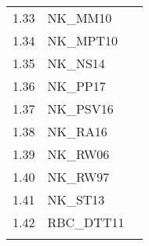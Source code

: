 \documentclass[11pt,a4paper]{article}
\begin{document}
\begin{table}[H]
\begin{tabularx}{\textwidth}{lll}
			1.33 &	NK\_MM10	&	\cite{MehMoran2010}	\\								
			1.34	&	NK\_MPT10	&	\cite{monacelli2010unemployment}	\\								
			1.35	&	NK\_NS14	&	\cite{NakamuraSteinsson2014}	\\								
			1.36	&	NK\_PP17	&	\cite{paoli2017coordinating}	\\								
			1.37	&	NK\_PSV16	&	\cite{pancrazi2016price}	\\								
			1.38	&	NK\_RA16	&	\cite{rannenberg2016bank}	\\								
			1.39\footnotemark[1]	&	NK\_RW06	&	\cite{RavennaWalsh2006}\\%
			1.40\footnotemark[1]	&	NK\_RW97	&	\cite{RotembergWoodford1997}	\\%
			1.41	&	NK\_ST13	&	\cite{stracca2013inside}	\\								
			1.42	&	RBC\_DTT11	&	\cite{DeFioreetal2011}	\\								
			
			&& \\
		
			\hline \hline
			
		\end{tabularx}
	\end{table}
	
	
	
	
	
	\vspace{-1cm}
	
\end{document}
